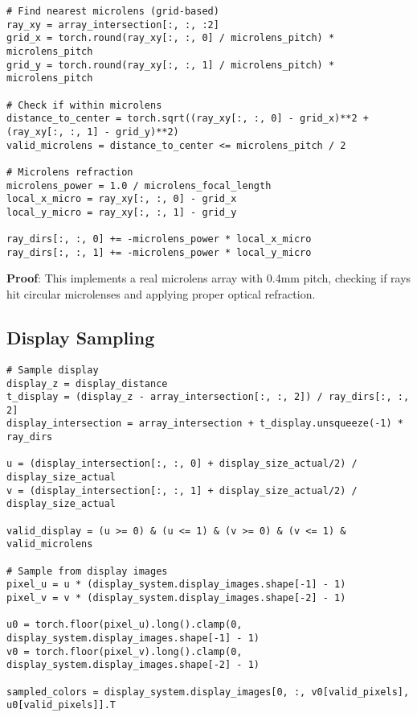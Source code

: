 \documentclass[11pt]{article}
\begin{document}
\begin{lstlisting}[caption={Microlens array interaction}]
# Find nearest microlens (grid-based)
ray_xy = array_intersection[:, :, :2]
grid_x = torch.round(ray_xy[:, :, 0] / microlens_pitch) * microlens_pitch
grid_y = torch.round(ray_xy[:, :, 1] / microlens_pitch) * microlens_pitch

# Check if within microlens
distance_to_center = torch.sqrt((ray_xy[:, :, 0] - grid_x)**2 + (ray_xy[:, :, 1] - grid_y)**2)
valid_microlens = distance_to_center <= microlens_pitch / 2

# Microlens refraction
microlens_power = 1.0 / microlens_focal_length
local_x_micro = ray_xy[:, :, 0] - grid_x
local_y_micro = ray_xy[:, :, 1] - grid_y

ray_dirs[:, :, 0] += -microlens_power * local_x_micro
ray_dirs[:, :, 1] += -microlens_power * local_y_micro
\end{lstlisting}

\textbf{Proof}: This implements a real microlens array with 0.4mm pitch, checking if rays hit circular microlenses and applying proper optical refraction.

\subsection{Display Sampling}

\begin{lstlisting}[caption={Display image sampling}]
# Sample display
display_z = display_distance
t_display = (display_z - array_intersection[:, :, 2]) / ray_dirs[:, :, 2]
display_intersection = array_intersection + t_display.unsqueeze(-1) * ray_dirs

u = (display_intersection[:, :, 0] + display_size_actual/2) / display_size_actual
v = (display_intersection[:, :, 1] + display_size_actual/2) / display_size_actual

valid_display = (u >= 0) & (u <= 1) & (v >= 0) & (v <= 1) & valid_microlens

# Sample from display images
pixel_u = u * (display_system.display_images.shape[-1] - 1)
pixel_v = v * (display_system.display_images.shape[-2] - 1)

u0 = torch.floor(pixel_u).long().clamp(0, display_system.display_images.shape[-1] - 1)
v0 = torch.floor(pixel_v).long().clamp(0, display_system.display_images.shape[-2] - 1)

sampled_colors = display_system.display_images[0, :, v0[valid_pixels], u0[valid_pixels]].T
\end{lstlisting}
\end{document}
